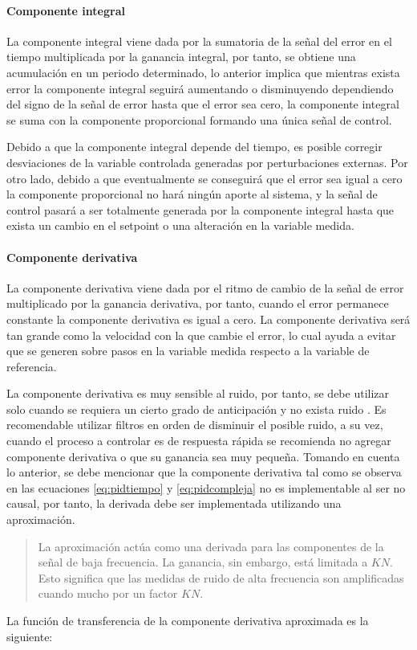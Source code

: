 			\paragraph{Componente integral}

				La componente integral viene dada por la sumatoria de la señal del error en el tiempo multiplicada por la ganancia integral, por tanto, se obtiene una acumulación en un periodo determinado, lo anterior implica que mientras exista error la componente integral seguirá aumentando o disminuyendo dependiendo del signo de la señal de error hasta que el error sea cero, la componente integral se suma con la componente proporcional formando una única señal de control.

				Debido a que la componente integral depende del tiempo, es posible corregir desviaciones de la variable controlada generadas por perturbaciones externas. Por otro lado, debido a que eventualmente se conseguirá que el error sea igual a cero la componente proporcional no hará ningún aporte al sistema, y la señal de control pasará a ser totalmente generada por la componente integral hasta que exista un cambio en el setpoint o una alteración en la variable medida.

			\paragraph{Componente derivativa}

				La componente derivativa viene dada por el ritmo de cambio de la señal de error multiplicado por la ganancia derivativa, por tanto, cuando el error permanece constante la componente derivativa es igual a cero. La componente derivativa será tan grande como la velocidad con la que cambie el error, lo cual ayuda a evitar que se generen sobre pasos en la variable medida respecto a la variable de referencia.
				
				La componente derivativa es muy sensible al ruido, por tanto, se debe utilizar solo cuando se requiera un cierto grado de anticipación y no exista ruido \Parencite{smith1985principles}. Es recomendable utilizar filtros en orden de disminuir el posible ruido, a su vez, cuando el proceso a controlar es de respuesta rápida se recomienda no agregar componente derivativa o que su ganancia sea muy pequeña. Tomando en cuenta lo anterior, se debe mencionar que la componente derivativa tal como se observa en las ecuaciones \cref{eq:pidtiempo} y \cref{eq:pidcompleja} no es implementable al ser no causal, por tanto, la derivada debe ser implementada utilizando una aproximación. \blockquote[{\cite[p.220]{aastrom2002control}}]{La aproximación actúa como una derivada para las componentes de la señal de baja frecuencia. La ganancia, sin embargo, está limitada a $KN$. Esto significa que las medidas de ruido de alta frecuencia son amplificadas cuando mucho por un factor $KN$.} La función de transferencia de la componente derivativa aproximada es la siguiente:

